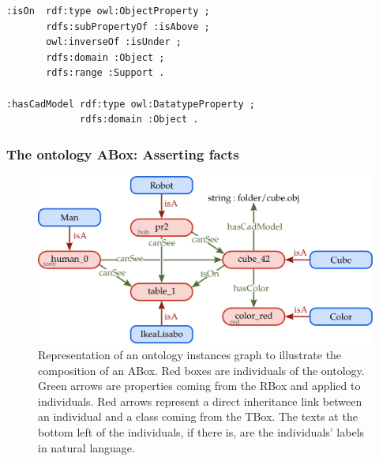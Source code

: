 \begin{lstlisting}[frame=single, basicstyle=\scriptsize\ttfamily, label={lst:Rbox}, caption={Description of ontology properties in the OWL language using the Turle syntax.},captionpos=b, style=OwlTurtle]
:isOn  rdf:type owl:ObjectProperty ;
       rdfs:subPropertyOf :isAbove ;
       owl:inverseOf :isUnder ;
       rdfs:domain :Object ;
       rdfs:range :Support .

:hasCadModel rdf:type owl:DatatypeProperty ;
             rdfs:domain :Object .
\end{lstlisting}

\subsubsection{The ontology ABox: Asserting facts}

\begin{figure}[h!]
\centering
\includegraphics[scale=0.4]{figures/chapter2/Abox.png}
\caption{\label{fig:Abox}  Representation of an ontology instances graph to illustrate the composition of an ABox. Red boxes are individuals of the ontology. Green arrows are properties coming from the RBox and applied to individuals. Red arrows represent a direct inheritance link between an individual and a class coming from the TBox. The texts at the bottom left of the individuals, if there is, are the individuals' labels in natural language.}
\end{figure}

